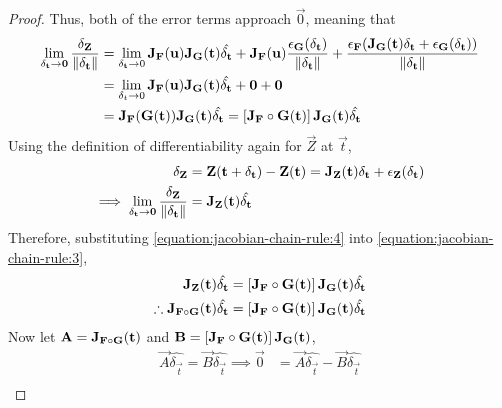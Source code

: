 \begin{lemma}
\begin{proof}
        Thus, both of the error terms approach $\vec{0}$, meaning that
        \begin{align}
            \notag\lim_{\delta_{\mathbf{t}}\rightarrow\mathbf{0}}\frac{\delta_{\mathbf{Z}}}{\lVert\delta_{\mathbf{t}}\rVert}&=\lim_{\delta_{\mathbf{t}}\rightarrow0}\mathbf{J}_{\mathbf{F}}(\mathbf{u})\mathbf{J}_{\mathbf{G}}(\mathbf{t})\hat{\delta_{\mathbf{t}}}+\mathbf{J}_{\mathbf{F}}(\mathbf{u})\frac{\epsilon_{\mathbf{G}}(\delta_{\mathbf{t}})}{\lVert\delta_{\mathbf{t}}\rVert}+\frac{\epsilon_{\mathbf{F}}(\mathbf{J}_{\mathbf{G}}(\mathbf{t})\delta_{\mathbf{t}}+\epsilon_{\mathbf{G}}(\delta_{\mathbf{t}}))}{\lVert\delta_{\mathbf{t}}\rVert}\\
            \notag&=\lim_{\delta_t\rightarrow0}\mathbf{J}_{\mathbf{F}}(\mathbf{u})\mathbf{J}_{\mathbf{G}}(\mathbf{t})\hat{\delta_{\mathbf{t}}}+\mathbf{0}+\mathbf{0}\\
            \label{equation:jacobian-chain-rule:3}&=\mathbf{J}_{\mathbf{F}}(\mathbf{G}(\mathbf{t}))\mathbf{J}_{\mathbf{G}}(\mathbf{t})\hat{\delta_{\mathbf{t}}}=\left[\mathbf{J}_{\mathbf{F}}\circ\mathbf{G}(\mathbf{t})\right]\mathbf{J}_{\mathbf{G}}(\mathbf{t})\hat{\delta_{\mathbf{t}}}
        \end{align}
        Using the definition of differentiability again for $\vec{Z}$ at $\vec{t}$,
        \begin{align}
            \notag\delta_{\mathbf{Z}}&=\mathbf{Z}(\mathbf{t}+\delta_{\mathbf{t}})-\mathbf{Z}(\mathbf{t})=\mathbf{J}_{\mathbf{Z}}(\mathbf{t})\delta_{\mathbf{t}}+\epsilon_{\mathbf{Z}}(\delta_{\mathbf{t}})\\
            \label{equation:jacobian-chain-rule:4}\implies\lim_{\delta_{\mathbf{t}}\rightarrow\mathbf{0}}\frac{\delta_{\mathbf{Z}}}{\lVert\delta_{\mathbf{t}}\rVert}&=\mathbf{J}_{\mathbf{Z}}(\mathbf{t})\hat{\delta_{\mathbf{t}}}
        \end{align}
        Therefore, substituting \eqref{equation:jacobian-chain-rule:4} into \eqref{equation:jacobian-chain-rule:3},
        \begin{align*}
            \mathbf{J}_{\mathbf{Z}}(\mathbf{t})\hat{\delta_{\mathbf{t}}}&=\left[\mathbf{J}_{\mathbf{F}}\circ\mathbf{G}(\mathbf{t})\right]\mathbf{J}_{\mathbf{G}}(\mathbf{t})\hat{\delta_{\mathbf{t}}}\\
            \therefore\mathbf{J}_{\mathbf{F}\circ\mathbf{G}}(\mathbf{t})\hat{\delta_{\mathbf{t}}}&=\left[\mathbf{J}_{\mathbf{F}}\circ\mathbf{G}(\mathbf{t})\right]\mathbf{J}_{\mathbf{G}}(\mathbf{t})\hat{\delta_{\mathbf{t}}}
        \end{align*}
        Now let $\mathbf{A}=\mathbf{J}_{\mathbf{F}\circ\mathbf{G}}(\mathbf{t})$ and $\mathbf{B}=\left[\mathbf{J}_{\mathbf{F}}\circ\mathbf{G}(\mathbf{t})\right]\mathbf{J}_{\mathbf{G}}(\mathbf{t})$,
        \begin{align*}
            \vec{A}\hat{\delta_\vec{t}}=\vec{B}\hat{\delta_\vec{t}}\implies\vec{0}&=\vec{A}\hat{\delta_\vec{t}}-\vec{B}\hat{\delta_\vec{t}}\\

\end{align*}
\end{proof}
\end{lemma}
